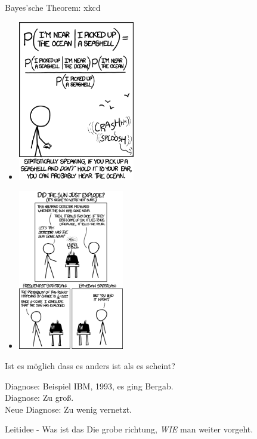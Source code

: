 \begin{frame}[c]{Bayes'sche Theorem: xkcd}
    \begin{multicols}{2}
    \begin{itemize}
        \item[]<1> \includegraphics[height=7cm]{strategy/xkcd_seashell.png}
        \item[]<2> \includegraphics[height=7cm]{strategy/xkcd_frequentists_vs_bayesians.png}
    \end{itemize}
    \end{multicols}
\end{frame}


\begin{frame}[standout]
    Ist es möglich dass es anders ist als es scheint?
\end{frame}


\begin{frame}[c]{Diagnose: Beispiel}
    IBM, 1993, es ging Bergab. \\
    Diagnose: Zu groß. \\ \pause
    Neue Diagnose: Zu wenig vernetzt.
\end{frame}


\begin{frame}[c]{Leitidee - Was ist das}
    \Large
    Die grobe richtung, {\em WIE} man weiter vorgeht.
\end{frame}


\begin{frame}
    
\end{frame}










